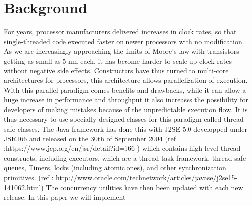 \documentclass{article}
\begin{document}
\section{Background}
For years, processor manufacturers delivered increases in clock rates, so that single-threaded code executed faster on newer processors with no modification. As we are increasingly approaching the limits of Moore’s law with transistors getting as small as 5 nm each, it has become harder to scale up clock rates without negative side effects. Constructors have thus turned to multi-core architectures for processors, this architecture allows parallelization of execution. With this parallel paradigm comes benefits and drawbacks, while it can allow a huge increase in performance and throughput it also increases the possibility for developers of making mistakes because of the unpredictable execution flow. It is thus necessary to use specially designed classes for this paradigm called thread safe classes. The Java framework has done this with J2SE 5.0 developped under JSR166 and released on the 30th of September 2004 (ref :https://www.jcp.org/en/jsr/detail?id=166 ) which contains high-level thread constructs, including executors, which are a thread task framework, thread safe queues, Timers, locks (including atomic ones), and other synchronization primitives. (ref : http://www.oracle.com/technetwork/articles/javase/j2se15-141062.html) The concurrency utilities have then been updated with each new release.
In this paper we will implement 
\end{document}
